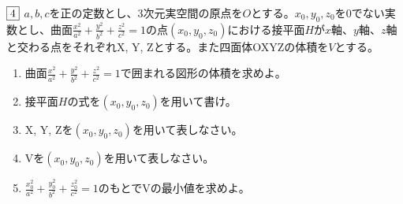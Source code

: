 \begin{tcolorbox} %
	$\fbox{4}$ $a, b, c$を正の定数とし、3次元実空間の原点を$O$とする。$x_0, y_0, z_0$を0でない実数とし、曲面$\frac{x^2}{a^2}+ \frac{y^2}{b^2}+ \frac{z^2}{c^2}= 1$の点$(x_0, y_0, z_0)$における接平面$H$が$x$軸、$y$軸、$z$軸と交わる点をそれぞれX, Y, Zとする。また四面体OXYZの体積を$V$とする。
\begin{enumerate}
	\item 曲面$\frac{x^2}{a^2}+ \frac{y^2}{b^2}+ \frac{z^2}{c^2}= 1$で囲まれる図形の体積を求めよ。
	\item 接平面$H$の式を$(x_0, y_0, z_0)$を用いて書け。
	\item X, Y, Zを$(x_0, y_0, z_0)$を用いて表しなさい。
	\item Vを$(x_0, y_0, z_0)$を用いて表しなさい。
	\item $\frac{x_0^2}{a^2}+ \frac{y_0^2}{b^2}+ \frac{z_0^2}{c^2}= 1$のもとでVの最小値を求めよ。
\end{enumerate}
\end{tcolorbox}

